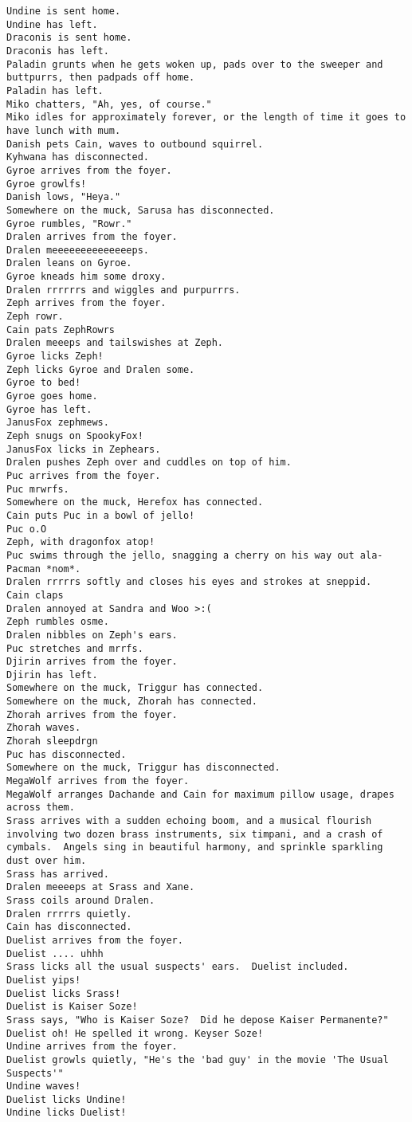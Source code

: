 \begin{verbatim}
Undine is sent home.
Undine has left.
Draconis is sent home.
Draconis has left.
Paladin grunts when he gets woken up, pads over to the sweeper and buttpurrs, then padpads off home.
Paladin has left.
Miko chatters, "Ah, yes, of course."
Miko idles for approximately forever, or the length of time it goes to have lunch with mum.
Danish pets Cain, waves to outbound squirrel.
Kyhwana has disconnected.
Gyroe arrives from the foyer.
Gyroe growlfs!
Danish lows, "Heya."
Somewhere on the muck, Sarusa has disconnected.
Gyroe rumbles, "Rowr."
Dralen arrives from the foyer.
Dralen meeeeeeeeeeeeeeps.
Dralen leans on Gyroe.
Gyroe kneads him some droxy.
Dralen rrrrrrs and wiggles and purpurrrs.
Zeph arrives from the foyer.
Zeph rowr.
Cain pats ZephRowrs
Dralen meeeps and tailswishes at Zeph.
Gyroe licks Zeph!
Zeph licks Gyroe and Dralen some.
Gyroe to bed!
Gyroe goes home.
Gyroe has left.
JanusFox zephmews.
Zeph snugs on SpookyFox!
JanusFox licks in Zephears.
Dralen pushes Zeph over and cuddles on top of him.
Puc arrives from the foyer.
Puc mrwrfs.
Somewhere on the muck, Herefox has connected.
Cain puts Puc in a bowl of jello!
Puc o.O
Zeph, with dragonfox atop!
Puc swims through the jello, snagging a cherry on his way out ala-Pacman *nom*.
Dralen rrrrrs softly and closes his eyes and strokes at sneppid.
Cain claps
Dralen annoyed at Sandra and Woo >:(
Zeph rumbles osme.
Dralen nibbles on Zeph's ears.
Puc stretches and mrrfs.
Djirin arrives from the foyer.
Djirin has left.
Somewhere on the muck, Triggur has connected.
Somewhere on the muck, Zhorah has connected.
Zhorah arrives from the foyer.
Zhorah waves.
Zhorah sleepdrgn
Puc has disconnected.
Somewhere on the muck, Triggur has disconnected.
MegaWolf arrives from the foyer.
MegaWolf arranges Dachande and Cain for maximum pillow usage, drapes across them.
Srass arrives with a sudden echoing boom, and a musical flourish involving two dozen brass instruments, six timpani, and a crash of cymbals.  Angels sing in beautiful harmony, and sprinkle sparkling dust over him.
Srass has arrived.
Dralen meeeeps at Srass and Xane.
Srass coils around Dralen.
Dralen rrrrrs quietly.
Cain has disconnected.
Duelist arrives from the foyer.
Duelist .... uhhh
Srass licks all the usual suspects' ears.  Duelist included.
Duelist yips!
Duelist licks Srass!
Duelist is Kaiser Soze!
Srass says, "Who is Kaiser Soze?  Did he depose Kaiser Permanente?"
Duelist oh! He spelled it wrong. Keyser Soze!
Undine arrives from the foyer.
Duelist growls quietly, "He's the 'bad guy' in the movie 'The Usual Suspects'"
Undine waves!
Duelist licks Undine!
Undine licks Duelist!

\end{verbatim}
